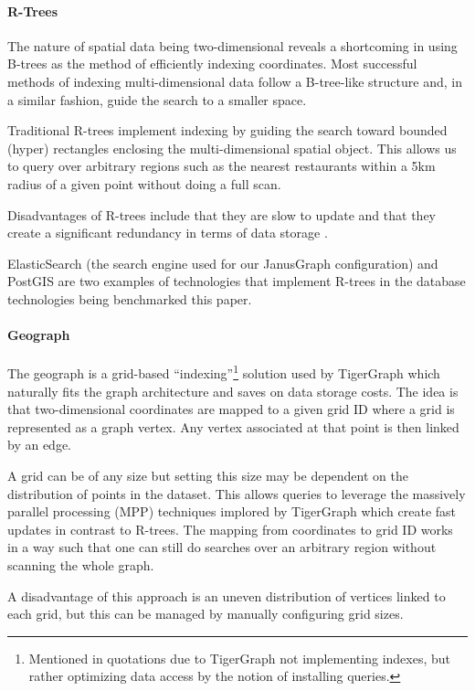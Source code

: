 \paragraph{R-Trees}

The nature of spatial data being two-dimensional reveals a shortcoming in using B-trees as the method of efficiently indexing coordinates. Most successful methods of indexing multi-dimensional data follow a B-tree-like structure \cite{rtree} and, in a similar fashion, guide the search to a smaller space.

Traditional R-trees implement indexing by guiding the search toward bounded (hyper) rectangles enclosing the multi-dimensional spatial object. This allows us to query over arbitrary regions such as the nearest restaurants within a 5km radius of a given point without doing a full scan.

Disadvantages of R-trees include that they are slow to update and that they create a significant redundancy in terms of data storage \cite{graphGurus}.

ElasticSearch (the search engine used for our JanusGraph configuration) and PostGIS are two examples of technologies that implement R-trees in the database technologies being benchmarked this paper.

\paragraph{Geograph}

The geograph is a grid-based ``indexing''\footnote{Mentioned in quotations due to TigerGraph not implementing indexes, but rather optimizing data access by the notion of installing queries.} solution used by TigerGraph which naturally fits the graph architecture and saves on data storage costs. The idea is that two-dimensional coordinates are mapped to a given grid ID where a grid is represented as a graph vertex. Any vertex associated at that point is then linked by an edge.

A grid can be of any size but setting this size may be dependent on the distribution of points in the dataset. This allows queries to leverage the massively parallel processing (MPP) techniques implored by TigerGraph which create fast updates in contrast to R-trees. The mapping from coordinates to grid ID works in a way such that one can still do searches over an arbitrary region without scanning the whole graph.

A disadvantage of this approach is an uneven distribution of vertices linked to each grid, but this can be managed by manually configuring grid sizes.

